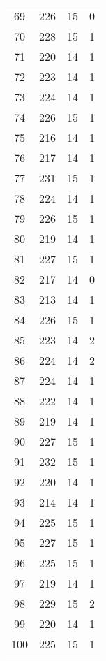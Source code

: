 \begin{longtable}[!]{c|ccc}
	69	& 226	& 15	& 0	\\
	70	& 228	& 15	& 1	\\
	71	& 220	& 14	& 1	\\
	72	& 223	& 14	& 1	\\
	73	& 224	& 14	& 1	\\
	74	& 226	& 15	& 1	\\
	75	& 216	& 14	& 1	\\
	76	& 217	& 14	& 1	\\
	77	& 231	& 15	& 1	\\
	78	& 224	& 14	& 1	\\
	79	& 226	& 15	& 1	\\
	80	& 219	& 14	& 1	\\
	81	& 227	& 15	& 1	\\
	82	& 217	& 14	& 0	\\
	83	& 213	& 14	& 1	\\
	84	& 226	& 15	& 1	\\
	85	& 223	& 14	& 2	\\
	86	& 224	& 14	& 2	\\
	87	& 224	& 14	& 1	\\
	88	& 222	& 14	& 1	\\
	89	& 219	& 14	& 1	\\
	90	& 227	& 15	& 1	\\
	91	& 232	& 15	& 1	\\
	92	& 220	& 14	& 1	\\
	93	& 214	& 14	& 1	\\
	94	& 225	& 15	& 1	\\
	95	& 227	& 15	& 1	\\
	96	& 225	& 15	& 1	\\
	97	& 219	& 14	& 1	\\
	98	& 229	& 15	& 2	\\
	99	& 220	& 14	& 1	\\
	100	& 225	& 15	& 1	\\
\end{longtable}


